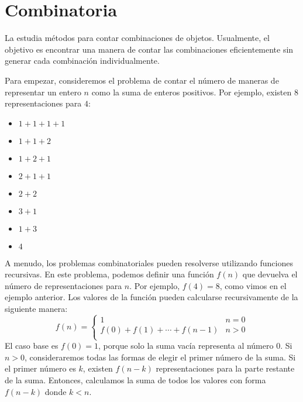 \chapter{Combinatoria}


La  estudia métodos para contar combinaciones de objetos.
Usualmente, el objetivo es encontrar una manera de contar las combinaciones
eficientemente sin generar cada combinación individualmente.

Para empezar, consideremos el problema de contar el número de maneras de
representar un entero $n$ como la suma de enteros positivos. Por ejemplo,
existen 8 representaciones para $4$:
\begin{multicols}{2}
    \begin{itemize}
        \item $1+1+1+1$
        \item $1+1+2$
        \item $1+2+1$
        \item $2+1+1$
        \item $2+2$
        \item $3+1$
        \item $1+3$
        \item $4$
    \end{itemize}
\end{multicols}

A menudo, los problemas combinatoriales pueden resolverse utilizando funciones
recursivas. En este problema, podemos definir una función $f(n)$ que devuelva
el número de representaciones para $n$. Por ejemplo, $f(4)=8$, como vimos en el
ejemplo anterior. Los valores de la función pueden calcularse recursivamente
de la siguiente manera:
\begin{equation*}
    f(n) = \begin{cases}
        1                       & n = 0 \\
        f(0)+f(1)+\cdots+f(n-1) & n > 0 \\
    \end{cases}
\end{equation*}
El caso base es $f(0)=1$, porque solo la suma vacía representa al número 0.
Si $n>0$, consideraremos todas las formas de elegir el primer número de
la suma. Si el primer número es $k$, existen $f(n-k)$ representaciones para
la parte restante de la suma. Entonces, calculamos la suma de todos los
valores con forma $f(n-k)$ donde $k<n$.

